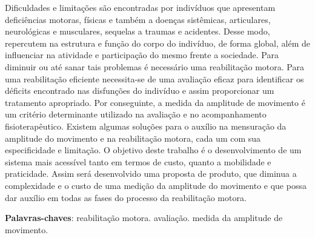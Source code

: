 \begin{resumo}

Dificuldades e limitações são encontradas por indivíduos que apresentam deficiências
 motoras, físicas e também a doenças sistêmicas, articulares, neurológicas e musculares,
 sequelas a traumas e acidentes. Desse modo, repercutem na estrutura e função do corpo
 do indivíduo, de forma global, além de influenciar na atividade e participação do
 mesmo frente a sociedade. Para diminuir ou até sanar tais problemas é necessário uma
 reabilitação motora. Para uma reabilitação eficiente necessita-se de uma avaliação
 eficaz para identificar os déficits encontrado nas disfunções do indivíduo e assim
proporcionar um tratamento apropriado. Por conseguinte, a medida da amplitude de
 movimento é um critério determinante utilizado na avaliação e no acompanhamento
 fisioterapêutico. Existem algumas soluções para o auxílio na mensuração da amplitude
 do movimento e na reabilitação motora, cada um com sua especificidade e limitação.
O objetivo deste trabalho é o desenvolvimento de um sistema mais acessível tanto em termos de custo,
 quanto a mobilidade e praticidade. Assim será desenvolvido uma proposta de produto, que diminua a
complexidade e o custo de uma medição da amplitude do movimento e que possa
 dar auxílio em todas as fases do processo da reabilitação motora.
 \vspace{\onelineskip}

 \noindent
 \textbf{Palavras-chaves}: reabilitação motora. avaliação. medida da amplitude de movimento.
\end{resumo}
